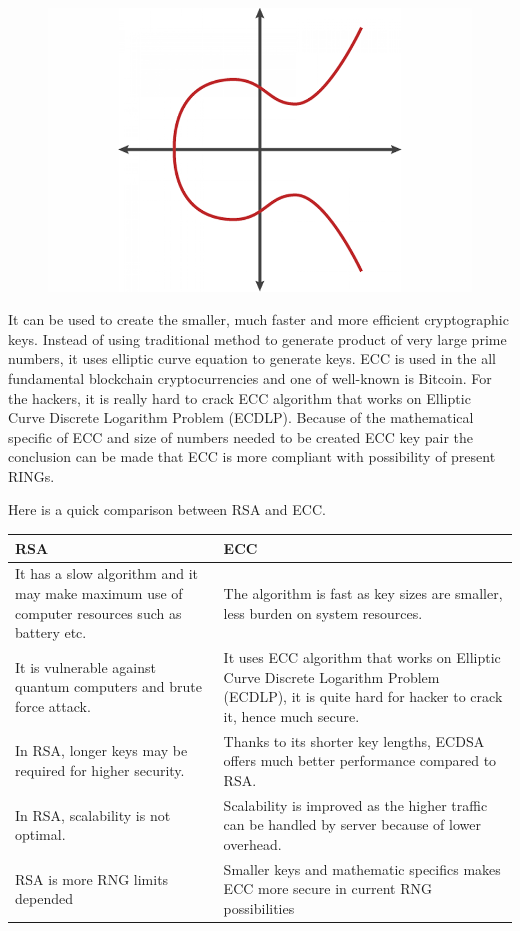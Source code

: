\documentclass[graybox]{svmult}
\begin{document}
\begin{figure}[h]
\sidecaption
\includegraphics[width=\textwidth,height=0.5\textwidth]{fig01}
\caption{}
\label{fig:01}
\end{figure}

It can be used to create the smaller, much faster and more efficient cryptographic keys. Instead of using traditional method to generate product of very large prime numbers, it uses elliptic curve equation to generate keys. ECC is used in the all fundamental blockchain cryptocurrencies and one of well-known is Bitcoin. For the hackers, it is really hard to crack ECC algorithm that works on Elliptic Curve Discrete Logarithm Problem (ECDLP). Because of the mathematical specific of ECC and size of numbers needed to be created ECC key pair the conclusion can be made that ECC is more compliant with possibility of present RINGs.

Here is a quick comparison between RSA and ECC.

\begin{center}
\begin{tabular}{ | m{6cm} | m{6cm} | }
\hline
RSA & ECC \\
\hline
It has a slow algorithm and it may make maximum use of computer resources such as battery etc. & The algorithm is fast as key sizes are smaller, less burden on system resources. \\
\hline
It is vulnerable against quantum computers and brute force attack. & It uses ECC algorithm that works on Elliptic Curve Discrete Logarithm Problem (ECDLP), it is quite hard for hacker to crack it, hence much secure. \\
\hline
In RSA, longer keys may be required for higher security. & Thanks to its shorter key lengths, ECDSA offers much better performance compared to RSA. \\
\hline
In RSA, scalability is not optimal. & Scalability is improved as the higher traffic can be handled by server because of lower overhead. \\
\hline
RSA is more RNG limits depended & Smaller keys and mathematic specifics makes ECC more secure in current RNG possibilities \\
\hline
\end{tabular}
\end{center}
\end{document}
